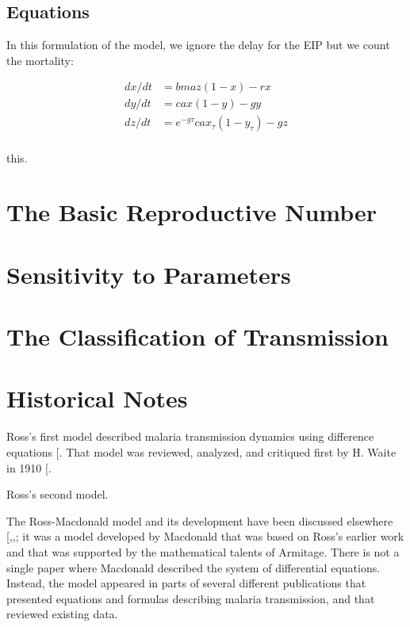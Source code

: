 \documentclass[
]{book}
\begin{document}
\subsection{Equations}\label{equations-2}

In this formulation of the model, we ignore the delay for the EIP but we count the mortality:

\[ 
\begin{array}{rl}
dx/dt &= b m a z (1-x) - r x \\
dy/dt &= c a x (1-y) - g y  \\
dz/dt &= e^{-g \tau} c a x_\tau (1-y_\tau) - g z  \\
\end{array}
\]

this.

\section{The Basic Reproductive Number}\label{the-basic-reproductive-number}

\section{Sensitivity to Parameters}\label{sensitivity-to-parameters}

\section{The Classification of Transmission}\label{the-classification-of-transmission}

\section{Historical Notes}\label{historical-notes-2}

Ross's first model described malaria transmission dynamics using difference equations {[}\citeproc{ref-RossR1908}{13}{]}. That model was reviewed, analyzed, and critiqued first by H. Waite in 1910 {[}\citeproc{ref-WaiteH1910MosquitoesMalaria}{64}{]}.

Ross's second model.

The Ross-Macdonald model and its development have been discussed elsewhere {[},,\citeproc{ref-BaileyNTJ1982BiomathematicsMalaria}{58}{]}; it was a model developed by Macdonald that was based on Ross's earlier work and that was supported by the mathematical talents of Armitage. There is not a single paper where Macdonald described the system of differential equations. Instead, the model appeared in parts of several different publications that presented equations and formulas describing malaria transmission, and that reviewed existing data.
\end{document}
